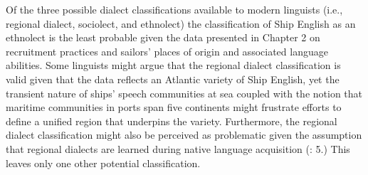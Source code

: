 Of the three possible dialect classifications available to modern linguists (i.e., regional dialect, sociolect, and ethnolect) the classification of Ship English as an ethnolect is the least probable given the data presented in Chapter 2 on recruitment practices and sailors’ places of origin and associated language abilities. Some linguists might argue that the regional dialect classification is valid given that the data reflects an Atlantic variety of Ship English, yet the transient nature of ships’ speech communities at sea coupled with the notion that maritime communities in ports span five continents might frustrate efforts to define a unified region that underpins the variety. Furthermore, the regional dialect classification might also be perceived as problematic {given the assumption that regional dialects are} learned during native language acquisition{ (\citealt{ChambersTrudgill1998}: 5.) This leaves only one other potential classification.} 

